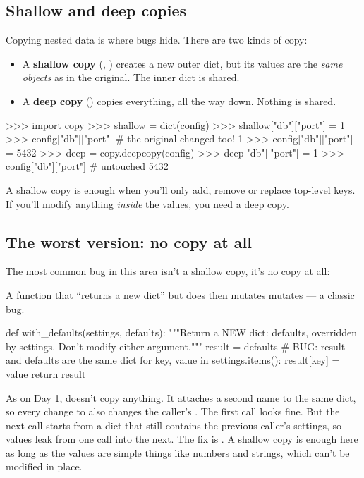 \documentclass[10pt,a4paper]{article}
\begin{document}
\subsection{Shallow and deep copies}
Copying nested data is where bugs hide. There are two kinds of copy:
\begin{itemize}
\item A \textbf{shallow copy} (, ) creates a new outer dict, but its values are the \emph{same objects} as in the original. The inner dict is shared.
\item A \textbf{deep copy} () copies everything, all the way down. Nothing is shared.
\end{itemize}
\begin{txtcode}
>>> import copy
>>> shallow = dict(config)
>>> shallow["db"]["port"] = 1
>>> config["db"]["port"]          # the original changed too!
1
>>> config["db"]["port"] = 5432
>>> deep = copy.deepcopy(config)
>>> deep["db"]["port"] = 1
>>> config["db"]["port"]          # untouched
5432
\end{txtcode}
A shallow copy is enough when you’ll only add, remove or replace top-level keys. If you’ll modify anything \emph{inside} the values, you need a deep copy.
\subsection{The worst version: no copy at all}
The most common bug in this area isn’t a shallow copy, it’s no copy at all:
\begin{trapbox}
A function that “returns a new dict” but does  then mutates  mutates  — a classic bug.
\end{trapbox}
\begin{pycode}
def with_defaults(settings, defaults):
    """Return a NEW dict: defaults, overridden by settings. Don't modify either argument."""
    result = defaults                  # BUG: result and defaults are the same dict
    for key, value in settings.items():
        result[key] = value
    return result
\end{pycode}
As on Day 1,  doesn’t copy anything. It attaches a second name to the same dict, so every change to  also changes the caller’s . The first call looks fine. But the next call starts from a  dict that still contains the previous caller’s settings, so values leak from one call into the next. The fix is . A shallow copy is enough here as long as the values are simple things like numbers and strings, which can’t be modified in place.
\setcounter{section}{7}
\end{document}
